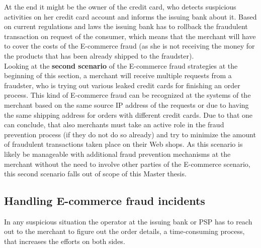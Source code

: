 At the end it might be the owner of the credit card, who detects suspicious activities on her credit card account and informs the issuing bank about it. Based on current regulations and laws the issuing bank has to rollback the fraudulent transaction on request of the consumer, which means that the merchant will have to cover the costs of the E-commerce fraud (as she is not receiving the money for the products that has been already shipped to the fraudster). \\

Looking at the \textbf{second scenario} of the E-commerce fraud strategies at the beginning of this section, a merchant will receive multiple requests from a fraudster, who is trying out various leaked credit cards for finishing an order process. This kind of E-commerce fraud can be recognized at the systems of the merchant based on the same source \gls{IP} address of the requests or due to having the same shipping address for orders with different credit cards. Due to that one can conclude, that also merchants must take an active role in the fraud prevention process (if they do not do so already) and try to minimize the amount of fraudulent transactions taken place on their Web shops. As this scenario is likely be manageable with additional fraud prevention mechanisms at the merchant without the need to involve other parties of the E-commerce scenario, this second scenario falls out of scope of this Master thesis.


\subsection{Handling E-commerce fraud incidents}
\label{subsec:e_commerce_fraud_handling}

In any suspicious situation the operator at the issuing bank or \gls{PSP} has to reach out to the merchant to figure out the order details, a time-consuming process, that increases the efforts on both sides. \\


